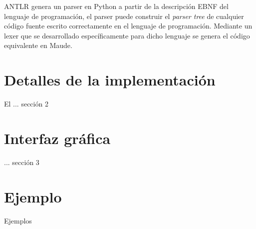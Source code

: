 ANTLR genera un parser en Python a partir de la descripci\'on EBNF del lenguaje de programaci\'on, el parser puede construir el \textit{parser tree} de cualquier c\'odigo fuente escrito correctamente en el lenguaje de programaci\'on. Mediante un lexer que se  desarrollado espec\'ificamente para dicho lenguaje se genera el c\'odigo equivalente en Maude. 

\section{Detalles de la implementaci\'on}
\label{implem.envir}

El
... secci\'on 2

\section{Interfaz gr\'afica}
\label{gui.envir}

... secci\'on 3

\section{Ejemplo}
\label{example.envir}

Ejemplos
